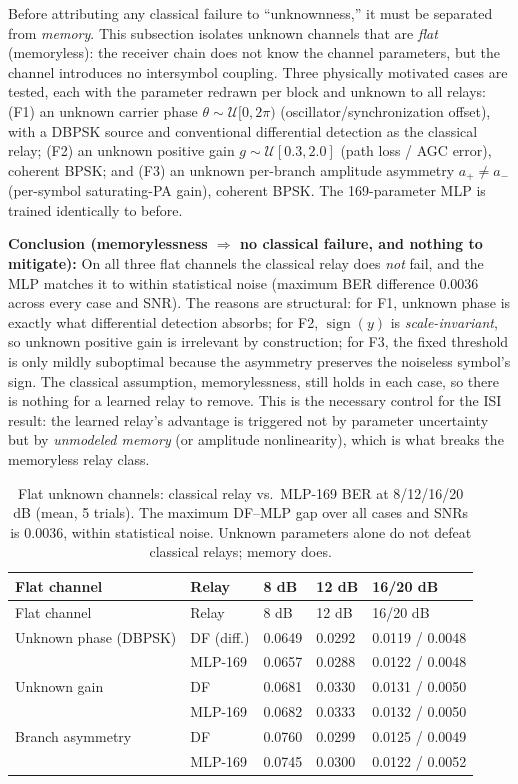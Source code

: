 Before attributing any classical failure to ``unknownness,'' it must be separated from \emph{memory}. This subsection isolates unknown channels that are \emph{flat} (memoryless): the receiver chain does not know the channel parameters, but the channel introduces no intersymbol coupling. Three physically motivated cases are tested, each with the parameter redrawn per block and unknown to all relays: (F1) an unknown carrier phase $\theta\sim\mathcal{U}[0,2\pi)$ (oscillator/synchronization offset), with a DBPSK source and conventional differential detection as the classical relay; (F2) an unknown positive gain $g\sim\mathcal{U}[0.3,2.0]$ (path loss / AGC error), coherent BPSK; and (F3) an unknown per-branch amplitude asymmetry $a_+\!\neq\!a_-$ (per-symbol saturating-PA gain), coherent BPSK. The 169-parameter MLP is trained identically to before.

\textbf{Conclusion (memorylessness $\Rightarrow$ no classical failure, and nothing to mitigate):} On all three flat channels the classical relay does \emph{not} fail, and the MLP matches it to within statistical noise (maximum BER difference $0.0036$ across every case and SNR). The reasons are structural: for F1, unknown phase is exactly what differential detection absorbs; for F2, $\operatorname{sign}(y)$ is \emph{scale-invariant}, so unknown positive gain is irrelevant by construction; for F3, the fixed threshold is only mildly suboptimal because the asymmetry preserves the noiseless symbol's sign. The classical assumption, memorylessness, still holds in each case, so there is nothing for a learned relay to remove. This is the necessary control for the ISI result: the learned relay's advantage is triggered not by parameter uncertainty but by \emph{unmodeled memory} (or amplitude nonlinearity), which is what breaks the memoryless relay class.


\begin{longtable}[]{@{}lllll@{}}
\caption{Flat unknown channels: classical relay vs.\ MLP-169 BER at 8/12/16/20 dB (mean, 5 trials). The maximum DF--MLP gap over all cases and SNRs is $0.0036$, within statistical noise. Unknown parameters alone do not defeat classical relays; memory does.}\label{tbl:tableE6flat}\tabularnewline
\toprule\noalign{}
Flat channel & Relay & 8 dB & 12 dB & 16/20 dB \\
\midrule\noalign{}
\endfirsthead
\toprule\noalign{}
Flat channel & Relay & 8 dB & 12 dB & 16/20 dB \\
\midrule\noalign{}
\endhead
\bottomrule\noalign{}
\endlastfoot
Unknown phase (DBPSK) & DF (diff.) & 0.0649 & 0.0292 & 0.0119 / 0.0048 \\
 & MLP-169 & 0.0657 & 0.0288 & 0.0122 / 0.0048 \\
Unknown gain & DF & 0.0681 & 0.0330 & 0.0131 / 0.0050 \\
 & MLP-169 & 0.0682 & 0.0333 & 0.0132 / 0.0050 \\
Branch asymmetry & DF & 0.0760 & 0.0299 & 0.0125 / 0.0049 \\
 & MLP-169 & 0.0745 & 0.0300 & 0.0122 / 0.0052 \\
\end{longtable}

